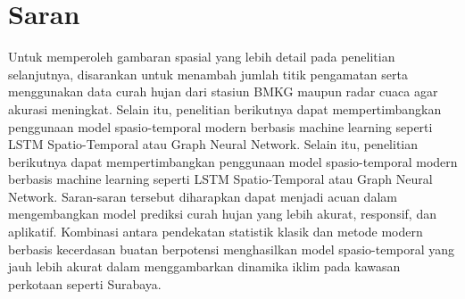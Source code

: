 \section{Saran}
Untuk memperoleh gambaran spasial yang lebih detail pada penelitian selanjutnya, disarankan untuk menambah jumlah titik pengamatan serta menggunakan data curah hujan dari stasiun BMKG maupun radar cuaca agar akurasi meningkat.
Selain itu, penelitian berikutnya dapat mempertimbangkan penggunaan model spasio-temporal modern berbasis machine learning seperti LSTM Spatio-Temporal atau Graph Neural Network.
Selain itu, penelitian berikutnya dapat mempertimbangkan penggunaan model spasio-temporal modern berbasis machine learning seperti LSTM Spatio-Temporal atau Graph Neural Network.
Saran-saran tersebut diharapkan dapat menjadi acuan dalam mengembangkan model prediksi curah hujan yang lebih akurat, responsif, dan aplikatif.
Kombinasi antara pendekatan statistik klasik dan metode modern berbasis kecerdasan buatan berpotensi menghasilkan model spasio-temporal yang jauh lebih akurat dalam menggambarkan dinamika iklim pada kawasan perkotaan seperti Surabaya.